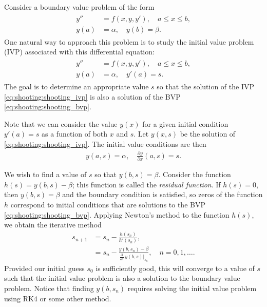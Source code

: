 \label{lab:Shooting}

Consider a boundary value problem of the form
\begin{align}
	\label{eq:shooting:shooting_bvp}
	\begin{split}
y'' &= f(x,y,y'), \quad a \leq x \leq b, \\
y(a) &= \alpha, \quad y(b) = \beta.
\end{split}
\end{align}
One natural way to approach this problem is to study the initial value problem (IVP) associated with this differential equation:
\begin{align}
	\label{eq:shooting:shooting_ivp}
	\begin{split}
y'' &= f(x,y,y'), \quad a \leq x \leq b, \\
y(a) &= \alpha, \quad y'(a) = s.
	\end{split}
\end{align}
The goal is to determine an appropriate value $s$ so that the solution of the IVP \eqref{eq:shooting:shooting_ivp} is also a solution of the BVP \eqref{eq:shooting:shooting_bvp}.

Note that we can consider the value \(y(x)\) for a given initial condition \(y'(a)=s\) as a function of both \(x\) and \(s\).
Let $y(x,s)$ be the solution of \eqref{eq:shooting:shooting_ivp}.
The initial value conditions are then
\begin{align}
y(a, s) = \alpha, \quad \frac{\partial y}{\partial x}(a, s) = s.
\end{align}

We wish to find a value of $s$ so that $y(b,s) = \beta$.
Consider the function \(h(s)=y(b,s)-\beta\); this function is called the \textit{residual function}.
If \(h(s)=0\), then \(y(b,s)=\beta\) and the boundary condition is satisfied, so zeros of the function \(h\) correspond to initial conditions that are solutions to the BVP \eqref{eq:shooting:shooting_bvp}.
Applying Newton's method to the function $h(s)$, we obtain the iterative method
\begin{align*}
	s_{n+1} &= s_n - \frac{ h(s_n)}{h'(s_n) }, \\
	&= s_n - \frac{ y(b,s_n) - \beta}{\frac{\partial}{\partial s}\, y(b,s)\big|_{s_n} },\quad n = 0,1,\ldots .
\end{align*}
Provided our initial guess \(s_0\) is sufficiently good, this will converge to a value of \(s\) such that the initial value problem is also a solution to the boundary value problem.
Notice that finding $y(b,s_n)$ requires solving the initial value problem using RK4 or some other method.

